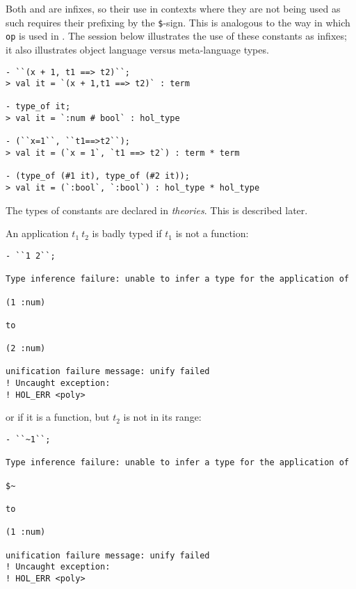 \noindent Both \ml{+} and \ml{==>} are infixes, so their use in
contexts where they are not being used as such requires their
prefixing by the \texttt{\$}-sign.  This is analogous to the way in
which \texttt{op} is used in \ML. The session below illustrates the
use of these constants as infixes; it also illustrates object language
versus meta-language types.

\begin{session}\begin{verbatim}
- ``(x + 1, t1 ==> t2)``;
> val it = `(x + 1,t1 ==> t2)` : term

- type_of it;
> val it = `:num # bool` : hol_type

- (``x=1``, ``t1==>t2``);
> val it = (`x = 1`, `t1 ==> t2`) : term * term

- (type_of (#1 it), type_of (#2 it));
> val it = (`:bool`, `:bool`) : hol_type * hol_type
\end{verbatim}\end{session}

\noindent The types of constants are declared in {\it theories}.  This is
described later.

An application $t_1\ t_2$ is badly typed if $t_1$ is not a function:

\begin{session}\begin{verbatim}
- ``1 2``;

Type inference failure: unable to infer a type for the application of

(1 :num)

to

(2 :num)

unification failure message: unify failed
! Uncaught exception:
! HOL_ERR <poly>
\end{verbatim}\end{session}

\noindent or if it is a function, but $t_2$ is not in its range:

\begin{session}\begin{verbatim}
- ``~1``;

Type inference failure: unable to infer a type for the application of

$~

to

(1 :num)

unification failure message: unify failed
! Uncaught exception:
! HOL_ERR <poly>
\end{verbatim}\end{session}

